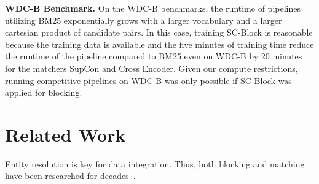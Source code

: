 \documentclass[sigconf,nonacm]{acmart}
\begin{document}
\vspace{.1cm}\noindent\textbf{WDC-B Benchmark.}
On the WDC-B benchmarks, the runtime of pipelines utilizing BM25 exponentially grows with a larger vocabulary and a larger cartesian product of candidate pairs.
In this case, training SC-Block is reasonable because the training data is available and the five minutes of training time reduce the runtime of the pipeline compared to BM25 even on WDC-B by 20 minutes for the matchers SupCon and Cross Encoder.
Given our compute restrictions, running competitive pipelines on WDC-B was only possible if SC-Block was applied for blocking.












 \section{Related Work}
\label{sec:related_work}



Entity resolution is key for data integration. Thus, both blocking and matching have been researched for decades~\cite{christen_data_2012, cohen_learning_2002, konda_magellan_2016, papadakis_blocking_2021}.
\end{document}
